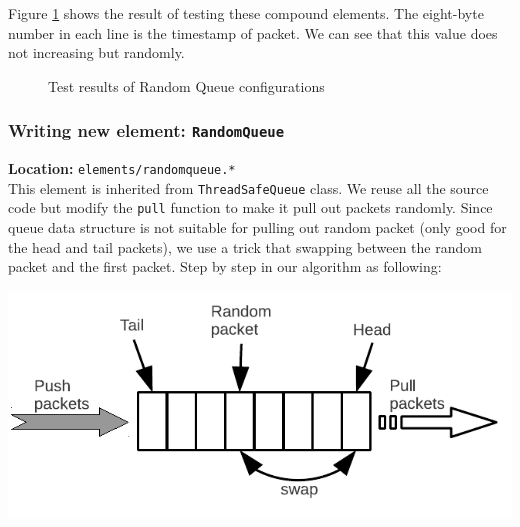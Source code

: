 \documentclass[a4paper]{article}
\begin{document}
  Figure \ref{fig:test-clickrandomqueue} shows the result of testing these compound elements. The eight-byte number in each line is the timestamp of packet. We can see that this value does not increasing but randomly. 
    \begin{figure}
      \centering
      \caption{Test results of Random Queue configurations}
      \label{fig:test-clickrandomqueue}
  \end{figure}
  
  \subsubsection{Writing new element: \texttt{RandomQueue}}
  \textbf{Location:} \texttt{elements/randomqueue.*} \\
  This element is inherited from \texttt{ThreadSafeQueue} class. We reuse all the source code but modify the \texttt{pull} function to make it pull out packets randomly. Since queue data structure is not suitable for pulling out random packet (only good for the head and tail packets), we use a trick that swapping between the random packet and the first packet. Step by step in our algorithm as following:
  \begin{center}
	\includegraphics[scale=0.80]{randomqueue-alg.pdf}
	\label{fig:randomqueue}
  \end{center}
\end{document}
